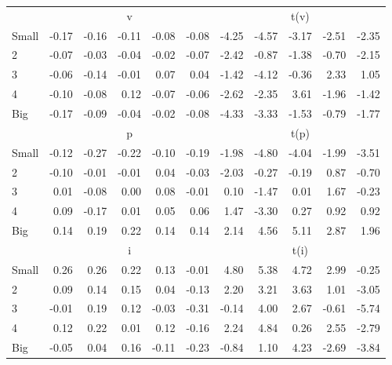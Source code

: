 \begin{table}[!ht]
\begin{tabular}{lrrrrrrrrrr}
  
     & \multicolumn{5}{c}{v} & \multicolumn{5}{c}{t(v)}   \\
     \cmidrule(r){2-6} \cmidrule(r){7-11} 
    Small  & -0.17  & -0.16  & -0.11  & -0.08  & -0.08  & -4.25  & -4.57  & -3.17  & -2.51  & -2.35   \\
    2  & -0.07  & -0.03  & -0.04  & -0.02  & -0.07  & -2.42  & -0.87  & -1.38  & -0.70  & -2.15   \\
    3  & -0.06  & -0.14  & -0.01  & 0.07  & 0.04  & -1.42  & -4.12  & -0.36  & 2.33  & 1.05   \\
    4  & -0.10  & -0.08  & 0.12  & -0.07  & -0.06  & -2.62  & -2.35  & 3.61  & -1.96  & -1.42   \\
    Big  & -0.17  & -0.09  & -0.04  & -0.02  & -0.08  & -4.33  & -3.33  & -1.53  & -0.79  & -1.77   \\
    
  
     & \multicolumn{5}{c}{p} & \multicolumn{5}{c}{t(p)}   \\
     \cmidrule(r){2-6} \cmidrule(r){7-11} 
    Small  & -0.12  & -0.27  & -0.22  & -0.10  & -0.19  & -1.98  & -4.80  & -4.04  & -1.99  & -3.51   \\
    2  & -0.10  & -0.01  & -0.01  & 0.04  & -0.03  & -2.03  & -0.27  & -0.19  & 0.87  & -0.70   \\
    3  & 0.01  & -0.08  & 0.00  & 0.08  & -0.01  & 0.10  & -1.47  & 0.01  & 1.67  & -0.23   \\
    4  & 0.09  & -0.17  & 0.01  & 0.05  & 0.06  & 1.47  & -3.30  & 0.27  & 0.92  & 0.92   \\
    Big  & 0.14  & 0.19  & 0.22  & 0.14  & 0.14  & 2.14  & 4.56  & 5.11  & 2.87  & 1.96   \\
    
  
     & \multicolumn{5}{c}{i} & \multicolumn{5}{c}{t(i)}   \\
     \cmidrule(r){2-6} \cmidrule(r){7-11} 
    Small  & 0.26  & 0.26  & 0.22  & 0.13  & -0.01  & 4.80  & 5.38  & 4.72  & 2.99  & -0.25   \\
    2  & 0.09  & 0.14  & 0.15  & 0.04  & -0.13  & 2.20  & 3.21  & 3.63  & 1.01  & -3.05   \\
    3  & -0.01  & 0.19  & 0.12  & -0.03  & -0.31  & -0.14  & 4.00  & 2.67  & -0.61  & -5.74   \\
    4  & 0.12  & 0.22  & 0.01  & 0.12  & -0.16  & 2.24  & 4.84  & 0.26  & 2.55  & -2.79   \\
    Big  & -0.05  & 0.04  & 0.16  & -0.11  & -0.23  & -0.84  & 1.10  & 4.23  & -2.69  & -3.84   \\
    

\end{tabular}
\end{table}
